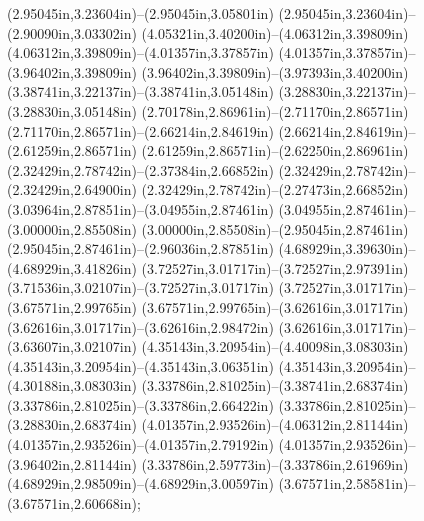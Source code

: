 (2.95045in,3.23604in)--(2.95045in,3.05801in) (2.95045in,3.23604in)--(2.90090in,3.03302in) (4.05321in,3.40200in)--(4.06312in,3.39809in) (4.06312in,3.39809in)--(4.01357in,3.37857in) (4.01357in,3.37857in)--(3.96402in,3.39809in) (3.96402in,3.39809in)--(3.97393in,3.40200in) (3.38741in,3.22137in)--(3.38741in,3.05148in) (3.28830in,3.22137in)--(3.28830in,3.05148in) (2.70178in,2.86961in)--(2.71170in,2.86571in) (2.71170in,2.86571in)--(2.66214in,2.84619in) (2.66214in,2.84619in)--(2.61259in,2.86571in) (2.61259in,2.86571in)--(2.62250in,2.86961in) (2.32429in,2.78742in)--(2.37384in,2.66852in) (2.32429in,2.78742in)--(2.32429in,2.64900in) (2.32429in,2.78742in)--(2.27473in,2.66852in) (3.03964in,2.87851in)--(3.04955in,2.87461in) (3.04955in,2.87461in)--(3.00000in,2.85508in) (3.00000in,2.85508in)--(2.95045in,2.87461in) (2.95045in,2.87461in)--(2.96036in,2.87851in) (4.68929in,3.39630in)--(4.68929in,3.41826in) (3.72527in,3.01717in)--(3.72527in,2.97391in) (3.71536in,3.02107in)--(3.72527in,3.01717in) (3.72527in,3.01717in)--(3.67571in,2.99765in) (3.67571in,2.99765in)--(3.62616in,3.01717in) (3.62616in,3.01717in)--(3.62616in,2.98472in) (3.62616in,3.01717in)--(3.63607in,3.02107in) (4.35143in,3.20954in)--(4.40098in,3.08303in) (4.35143in,3.20954in)--(4.35143in,3.06351in) (4.35143in,3.20954in)--(4.30188in,3.08303in) (3.33786in,2.81025in)--(3.38741in,2.68374in) (3.33786in,2.81025in)--(3.33786in,2.66422in) (3.33786in,2.81025in)--(3.28830in,2.68374in) (4.01357in,2.93526in)--(4.06312in,2.81144in) (4.01357in,2.93526in)--(4.01357in,2.79192in) (4.01357in,2.93526in)--(3.96402in,2.81144in) (3.33786in,2.59773in)--(3.33786in,2.61969in) (4.68929in,2.98509in)--(4.68929in,3.00597in) (3.67571in,2.58581in)--(3.67571in,2.60668in);
